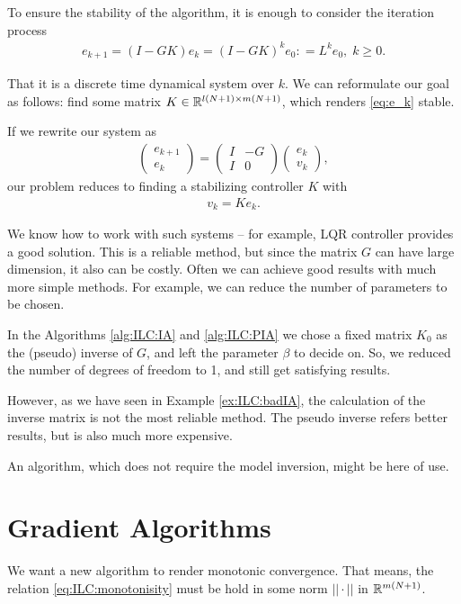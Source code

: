 To ensure the stability of the algorithm, it is enough to consider the iteration process 
\begin{align}
\label{eq:e_k}
e_{k+1} = (I - G K) e_k = (I - G K)^k e_0  : =  L^k e_{0}, \; k \geq 0.
\end{align}

That it is a discrete time dynamical system over $k$. We can reformulate our goal as follows: find some matrix $K \in {\mathbb{R}}^{l(N+1) \times m (N+1)}$, which renders \eqref{eq:e_k} stable. %

If we rewrite our system as
\begin{align}
\label{eq:ILC:e_kPlant}
\begin{pmatrix}
e_{k+1} \\ e_k
\end{pmatrix} = 
\left(
\begin{array}{c|c}
I & -G \\\hline I & 0
\end{array}\right) \begin{pmatrix}
e_k \\ v_k 
\end{pmatrix},
\end{align}
our problem reduces to finding a stabilizing controller $K$  with 
\begin{align}
v_k = K e_k.
\end{align} 

We know how to work with such systems -- for example, LQR controller provides a good solution. This is a reliable method, but since the matrix $G$ can have large dimension, it also can be costly. Often we can achieve good results with much more simple methods. For example, we can reduce the number of parameters to be chosen. 

In the Algorithms \ref{alg:ILC:IA} and \ref{alg:ILC:PIA} we chose a fixed matrix $K_0$ as the (pseudo) inverse of $G$, and left the parameter $\beta$ to decide on. So, we reduced the number of degrees of freedom to 1, and still get satisfying results.


However, as we have seen in Example \ref{ex:ILC:badIA}, the calculation of the  inverse matrix is not the most reliable method. The pseudo inverse refers better results, but is also much more expensive. 

An algorithm, which does not require the model inversion, might be here of use. 

	 \section{Gradient Algorithms}
We want a new algorithm to render monotonic convergence. 
That means, the relation \eqref{eq:ILC:monotonisity} must be hold in some norm $|| \cdot || $ in ${\mathbb{R}}^{m(N+1)}$. 

